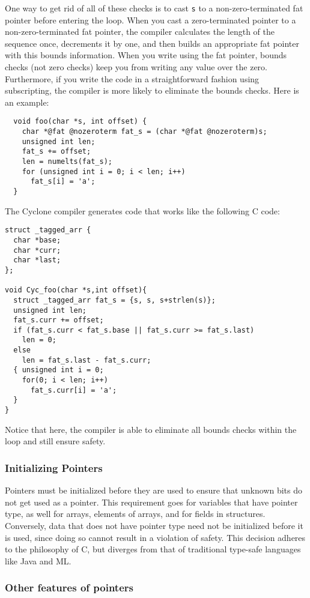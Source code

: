 One way to get rid of all of these checks is to cast \texttt{s} to a
non-zero-terminated fat pointer before entering the loop.  When you
cast a zero-terminated pointer to a non-zero-terminated fat pointer,
the compiler calculates the length of the sequence once, decrements it
by one, and then builds an appropriate fat pointer with this bounds
information.  When you write using the fat pointer, bounds checks (not
zero checks) keep you from writing any value over the zero.
Furthermore, if you write the code in a straightforward fashion using
subscripting, the compiler is more likely to eliminate the bounds
checks.  Here is an example:
\begin{verbatim}
  void foo(char *s, int offset) {
    char *@fat @nozeroterm fat_s = (char *@fat @nozeroterm)s;
    unsigned int len; 
    fat_s += offset;
    len = numelts(fat_s);    
    for (unsigned int i = 0; i < len; i++)
      fat_s[i] = 'a';
  }
\end{verbatim}
The Cyclone compiler generates code that works like the following C code:
\begin{verbatim}
struct _tagged_arr { 
  char *base;
  char *curr;
  char *last;
};

void Cyc_foo(char *s,int offset){
  struct _tagged_arr fat_s = {s, s, s+strlen(s)};
  unsigned int len;
  fat_s.curr += offset;
  if (fat_s.curr < fat_s.base || fat_s.curr >= fat_s.last) 
    len = 0;
  else 
    len = fat_s.last - fat_s.curr;
  { unsigned int i = 0;
    for(0; i < len; i++)
      fat_s.curr[i] = 'a';
  }
}
\end{verbatim}
Notice that here, the compiler is able to eliminate all bounds
checks within the loop and still ensure safety.

\subsubsection*{Initializing Pointers}

Pointers must be initialized before they are used to ensure that unknown
bits do not get used as a pointer.  This requirement goes for
variables that have pointer type, as well for arrays, elements of arrays,
and for fields in structures.  Conversely, data that does not have pointer
type need not be initialized before it is used, since doing so cannot result
in a violation of safety.  This decision adheres to the philosophy of C, but
diverges from that of traditional type-safe languages like Java and ML.

\subsubsection*{Other features of pointers}

